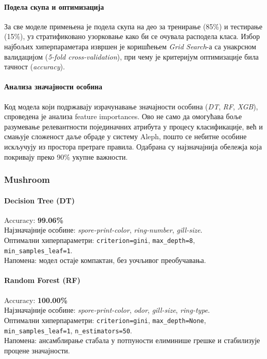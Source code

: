 \paragraph{Подела скупа и оптимизација} За све моделе примењена је подела скупа на део за тренирање (85\%) и тестирање (15\%), уз стратификовано узорковање како би се очувала расподела класа. Избор најбољих хиперпараметара извршен је коришћењем \textit{Grid Search}-а са унакрсном валидацијом (\textit{5-fold cross-validation}), при чему је критеријум оптимизације била тачност (\textit{accuracy}).

\paragraph{Анализа значајности особина} Код модела који подржавају израчунавање значајности особина (\textit{DT}, \textit{RF}, \textit{XGB}), спроведена је анализа feature importances. Ово не само да омогућава боље разумевање релевантности појединачних атрибута у процесу класификације, већ и смањује сложеност даље обраде у систему Aleph, пошто се небитне особине искључују из простора претраге правила. Одабрана су најзначајнија обележја која покривају преко 90\% укупне важности.

\subsubsection{Mushroom}

\paragraph{Decision Tree (DT)}
Accuracy: \textbf{99.06\%}\\
Најзначајније особине: \textit{spore-print-color}, \textit{ring-number}, \textit{gill-size}.\\
Оптимални хиперпараметри: \texttt{criterion=gini}, \texttt{max\_depth=8}, \texttt{min\_samples\_leaf=1}.\\
Напомена: модел остаје компактан, без уочљивог преобучавања.

\paragraph{Random Forest (RF)}
Accuracy: \textbf{100.00\%}\\
Најзначајније особине: \textit{spore-print-color}, \textit{odor}, \textit{gill-size}, \textit{ring-type}.\\
Оптимални хиперпараметри: \texttt{criterion=gini}, \texttt{max\_depth=None}, \texttt{min\_samples\_leaf=1}, \texttt{n\_estimators=50}.\\
Напомена: ансамблирање стабала у потпуности елиминише грешке и стабилизује процене значајности.

